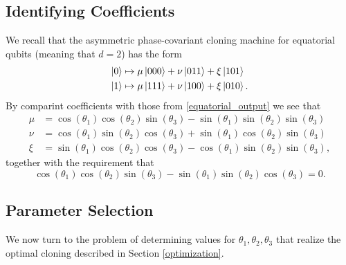 \documentclass[reqno]{amsart}
\numberwithin{lemma}{section}
\numberwithin{proposition}{section}
\begin{document}
{\subsection{Identifying Coefficients}
We recall that the asymmetric phase-covariant cloning machine for equatorial qubits (meaning that $d=2$) has the form
\begin{equation*}
\begin{aligned}
\ket{0} &\mapsto \mu \ket{000} + \nu \ket{011} + \xi \ket{101}\\
\ket{1} &\mapsto \mu \ket{111} + \nu \ket{100} + \xi \ket{010}.
\end{aligned}
\end{equation*}
By comparint coefficients with those from \eqref{equatorial_output} we see that
\begin{equation}
\label{coeffs_angles}
\begin{aligned}
\mu &= \cos(\theta_{1}) \cos(\theta_{2}) \sin(\theta_{3}) - \sin(\theta_{1}) \sin(\theta_{2}) \sin(\theta_{3})\\
\nu &= \cos(\theta_{1}) \sin(\theta_{2}) \cos(\theta_{3}) + \sin(\theta_{1}) \cos(\theta_{2}) \sin(\theta_{3})\\
\xi &= \sin(\theta_{1}) \cos(\theta_{2}) \cos(\theta_{3}) - \cos(\theta_{1}) \sin(\theta_{2}) \sin(\theta_{3}),
\end{aligned}
\end{equation}
together with the requirement that
\begin{equation}
\label{zero_condition}
 \cos(\theta_{1}) \cos(\theta_{2}) \sin(\theta_{3}) - \sin(\theta_{1}) \sin(\theta_{2}) \cos(\theta_{3}) = 0.
\end{equation}

\subsection{Parameter Selection}
We now turn to the problem of determining values for $\theta_{1}, \theta_{2}, \theta_{3}$ that realize the optimal cloning described in Section \ref{optimization}.

}
\end{document}
